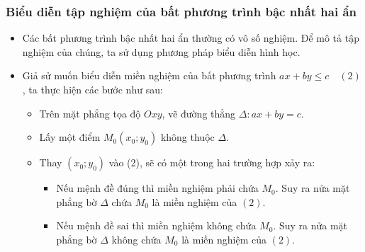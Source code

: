 \subsubsection{Biểu diễn tập nghiệm của bất phương trình bậc nhất hai ẩn}
\begin{itemize}
	\item [\iconMT] Các bất phương trình bậc nhất hai ẩn thường có vô số nghiệm. Để mô tả tập nghiệm của chúng, ta sử dụng phương pháp biểu diễn hình học.
	\item [\iconMT] Giả sử muốn biểu diễn miền nghiệm của bất phương trình $ax+by \le c \quad(2)$, ta thực hiện các bước như sau:
	\begin{boxdn}
		\begin{itemize}
			\item [\ding{172}] Trên mặt phẳng tọa độ $Oxy$, vẽ đường thẳng $\Delta \colon ax+by=c$.
			\item [\ding{173}] Lấy một điểm $M_0\left(x_0;y_0\right)$ không thuộc $\Delta$.
			\item [\ding{174}] Thay $(x_0;y_0)$ vào (2), sẽ có một trong hai trường hợp xảy ra: 
			\begin{itemize}
				\item Nếu mệnh đề đúng thì miền nghiệm phải chứa $M_0$. Suy ra nửa mặt phẳng bờ $\Delta$ chứa $M_0$ là miền nghiệm của $(2)$.
				\item Nếu mệnh đề sai thì miền nghiệm không chứa $M_0$. Suy ra nửa mặt phẳng bờ $\Delta$ không chứa $M_0$ là miền nghiệm của $(2)$.
			\end{itemize}
		\end{itemize}
	\end{boxdn}
\end{itemize}
